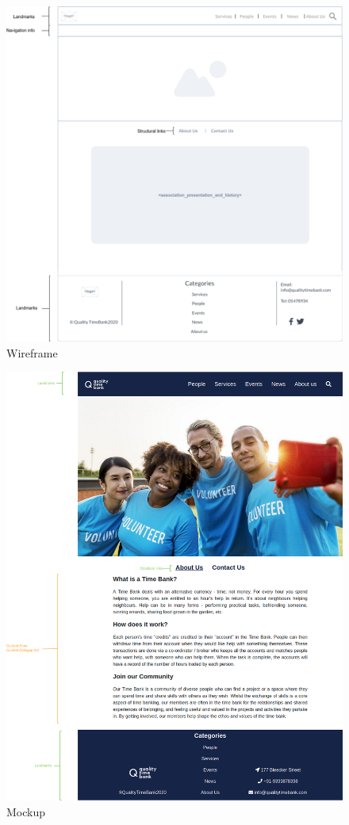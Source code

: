 \documentclass[a4paper, 11pt, parskip=half, headsepline]{scrreprt}
\begin{document}
\begin{figure}[H]
    \centering
    \includegraphics[width=1\linewidth, keepaspectratio]{wireframes/Topic-AboutUs}
    \caption{Wireframe}
\end{figure}

\begin{figure}[H]
    \centering
    \includegraphics[width=1\linewidth, keepaspectratio]{mockups/About_Us}
    \caption{Mockup}
\end{figure}
\end{document}
